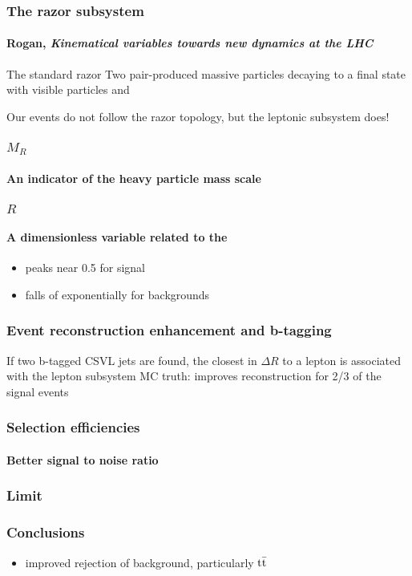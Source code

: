 \documentclass[ukenglish]{beamer}
\begin{document}
\begin{frame}
    \frametitle{The razor subsystem}
    \framesubtitle{Rogan, \emph{Kinematical variables towards new dynamics
    at the LHC}}
    \begin{block}{The standard razor}
        Two pair-produced massive particles decaying to a final state with
        visible particles and \MET
    \end{block}
    \alert{Our events do not follow the razor topology, but the leptonic
    subsystem does!}
\end{frame}

\begin{frame}
    \frametitle{$M_R$}
    \framesubtitle{An indicator of the heavy particle mass scale}
\end{frame}

\begin{frame}
    \frametitle{$R$}
    \framesubtitle{A dimensionless variable related to the \MET}
    \begin{itemize}
        \item peaks near 0.5 for signal
        \item falls of exponentially for backgrounds
    \end{itemize}
\end{frame}

\begin{frame}
    \frametitle{Event reconstruction enhancement and b-tagging}
    \alert{If two b-tagged CSVL jets are found, the closest in $\Delta R$ to
    a lepton is associated with the lepton subsystem}
    \alert{MC truth: improves reconstruction for 2/3 of the signal events}
\end{frame}

\begin{frame}
    \frametitle{Selection efficiencies}
    \framesubtitle{Better signal to noise ratio}
\end{frame}

\begin{frame}
    \frametitle{Limit}
\end{frame}

\begin{frame}
    \frametitle{Conclusions}
    \begin{itemize}
        \item improved rejection of background, particularly $\mathrm{t}\bar{\mathrm{t}}$
    \end{itemize}
\end{frame}
\end{document}
